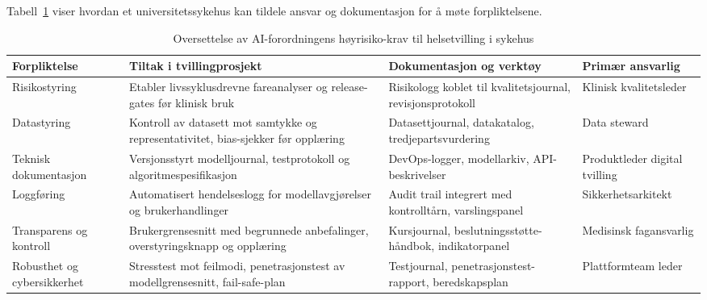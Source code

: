 Tabell~\ref{tab:ai-helsekrav} viser hvordan et universitetssykehus kan tildele ansvar og dokumentasjon for å møte forpliktelsene.

\begin{table}[ht]
    \centering
    \caption{Oversettelse av AI-forordningens høyrisiko-krav til helsetvilling i sykehus}
    \label{tab:ai-helsekrav}
    \begin{tabular}{|p{3.4cm}|p{4.6cm}|p{4.6cm}|p{3.0cm}|}
        \hline
        \textbf{Forpliktelse} & \textbf{Tiltak i tvillingprosjekt} & \textbf{Dokumentasjon og verktøy} & \textbf{Primær ansvarlig} \\
        \hline
        Risikostyring & Etabler livssyklusdrevne fareanalyser og release-gates før klinisk bruk & Risikologg koblet til kvalitetsjournal, revisjonsprotokoll \citep{dnv2023digitalassurance} & Klinisk kvalitetsleder \\
        \hline
        Datastyring & Kontroll av datasett mot samtykke og representativitet, bias-sjekker før opplæring & Datasettjournal, datakatalog, tredjepartsvurdering \citep{ehelse2024tilsyn} & Data steward \\
        \hline
        Teknisk dokumentasjon & Versjonsstyrt modelljournal, testprotokoll og algoritmespesifikasjon & DevOps-logger, modellarkiv, API-beskrivelser & Produktleder digital tvilling \\
        \hline
        Loggføring & Automatisert hendelseslogg for modellavgjørelser og brukerhandlinger & Audit trail integrert med kontrolltårn, varslingspanel & Sikkerhetsarkitekt \\
        \hline
        Transparens og kontroll & Brukergrensesnitt med begrunnede anbefalinger, overstyringsknapp og opplæring & Kursjournal, beslutningsstøtte-håndbok, indikatorpanel \citep{digdir2023styringai} & Medisinsk fagansvarlig \\
        \hline
        Robusthet og cybersikkerhet & Stresstest mot feilmodi, penetrasjonstest av modellgrensesnitt, fail-safe-plan & Testjournal, penetrasjonstest-rapport, beredskapsplan & Plattformteam leder \\
        \hline
    \end{tabular}
\end{table}

